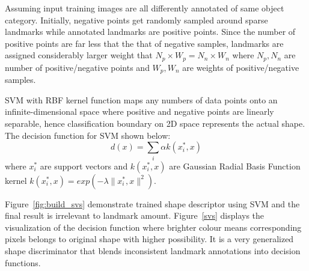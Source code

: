 Assuming input training images are all differently annotated of same object category. Initially, negative points get randomly sampled around sparse landmarks while annotated landmarks are positive points. Since the number of positive points are far less that the that of negative samples, landmarks are assigned considerably larger weight that $N_p \times W_p=N_n \times W_n$ where $N_p, N_n$ are number of positive/negative points and $W_p, W_n$ are weights of positive/negative samples.

SVM with RBF kernel function maps any numbers of data points onto an infinite-dimensional space where positive and negative points are linearly separable, hence classification boundary on 2D space represents the actual shape. The decision function for SVM shown below:
\begin{equation} \label{eq:decisionfunc}
    d(x)=\sum_i\alpha k(x_i^*,x)
\end{equation}
where $x_i^*$ are support vectors and $k(x_i^*,x)$ are Gaussian Radial Basis Function kernel $k(x_i^*,x)=exp(-\lambda \|x_i^*,x\|^2)$.

Figure~\ref{fig:build_svs} demonstrate trained shape descriptor using SVM and the final result is irrelevant to landmark amount. Figure~\ref{svs} displays the visualization of the decision function where brighter colour means corresponding pixels belongs to original shape with higher possibility. It is a very generalized shape discriminator that blends inconsistent landmark annotations into decision functions.


